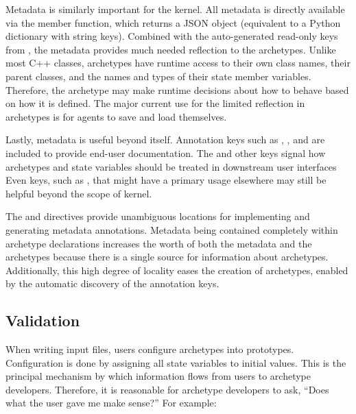 Metadata is similarly important for the \cyclus kernel. All metadata is
directly available via the  member function, which returns
a \gls{JSON}
object (equivalent to a Python dictionary with string keys). Combined with the
auto-generated read-only keys from \cycpp, the metadata provides much needed
reflection to the archetypes.  Unlike most C++ classes, archetypes have
runtime access to their own class names, their parent classes, and the names and
types of their state member variables. Therefore, the archetype may
make runtime decisions about how to behave based on how it is defined.
The major current use for the limited reflection in archetypes is for agents to
save and load themselves.

Lastly, metadata is useful beyond \cyclus itself. Annotation keys such as ,
, and  are included to provide end-user documentation.
The 
and other keys signal how archetypes and state variables should be treated in
downstream user interfaces
Even keys, such as ,
that might have a primary usage elsewhere
may still be helpful beyond the scope of \cyclus kernel.

The  and  directives provide
unambiguous locations for implementing and
generating metadata annotations. Metadata being contained completely within archetype
declarations increases the worth of both the metadata and the archetypes
because there is a single source for information about archetypes.
Additionally, this high degree of locality eases the creation of
archetypes, enabled by the automatic discovery of the annotation keys.

\subsection{Validation}

When writing \cyclus input files, users configure archetypes into prototypes.
Configuration is done by assigning all state variables to
initial values. This is the principal mechanism by which information flows
from users to archetype developers. Therefore, it is reasonable for archetype
developers to ask, ``Does what the user gave me make sense?'' For example:

